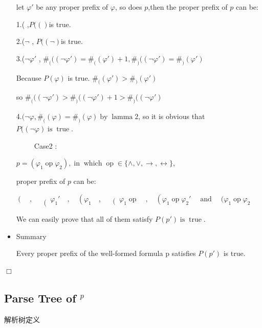\documentclass{article}
\newcommand{\nonconverted}[1]{\mbox{}}
\begin{document}
\begin{CJK*}{UTF8}{gbsn}
\begin{itemize}
  let $\varphi'$ be any proper prefix of $\varphi$, so does $p$,then the
  proper prefix of $p$ can be:
  
  1.( ,$P (() $is true.
  
  2.($\neg$ , $P ((\neg ) $is true.
  
  3.($\neg \varphi'$ , $\#_{(} (( \neg \varphi') =\#_{(} (\varphi') + 1,
  \#_{)} (( \neg \varphi') =\#_{)} (\varphi')$
  
  Because $P (\varphi)$ is true. $\#_{(} (\varphi') >\#_{)} (\varphi')$
  
  so $\#_{(} (( \neg \varphi') >\#_{)} (( \neg \varphi') + 1 >\#_{)} (( \neg
  \varphi')$
  
  4.$(\neg \varphi , \#_{(} (\varphi) =\#_{)} (\varphi)
  \ensuremath{\operatorname{by}}\ensuremath{\operatorname{lamma}}2$, so it is
  obvious that $P ((\neg \varphi )
  \ensuremath{\operatorname{is}}\ensuremath{\operatorname{true}}.$
  
  \ \ \ \ \ Case2 :
  
  $p = (\varphi_1 \ensuremath{\operatorname{op}} \varphi_2),
  \ensuremath{\operatorname{in}}\ensuremath{\operatorname{which}}\ensuremath{\operatorname{op}}
  \in \{ \wedge, \vee, \rightarrow, \leftrightarrow \}$,
  
  proper prefix of $p$ can be:
  
  $\left(  \quad, \quad  \right( \varphi_1' \hspace{1em}, \quad \left(
  \varphi_1 \quad, \quad \right( \varphi_1 \ensuremath{\operatorname{op}}
  \quad, \quad \left( \varphi_1 \ensuremath{\operatorname{op}} \varphi_2'
  \quad \right. \ensuremath{\operatorname{and}} \quad (\varphi_1
  \ensuremath{\operatorname{op}} \varphi_2 $
  
  We can easily prove that all of them satisfy $P (p')
  \ensuremath{\operatorname{is}}\ensuremath{\operatorname{true}}.$
  
  \item Summary
  
  Every proper prefix of the well-formed formula p satisfies $P (p')$ is true.
\end{itemize}
\hspace*{\fill}$\Box$\medskip

\subsection{Parse Tree of $\nonconverted{cal*L}^p$}

\begin{definition}
  解析树定义
  

\end{definition}
\end{CJK*}
\end{document}
